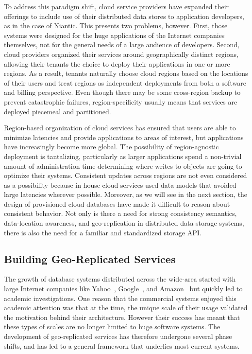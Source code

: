 To address this paradigm shift, cloud service providers have expanded their offerings to include use of their distributed data stores to application developers, as in the case of Niantic.
This presents two problems, however.
First, those systems were designed for the huge applications of the Internet companies themselves, not for the general needs of a large audience of developers.
Second, cloud providers organized their services around geographically distinct regions, allowing their tenants the choice to deploy their applications in one or more regions.
As a result, tenants naturally choose cloud regions based on the locations of their users and treat regions as independent deployments from both a software and billing perspective.
Even though there may be some cross-region backup to prevent catastrophic failures, region-specificity usually means that services are deployed piecemeal and partitioned.

Region-based organization of cloud services has ensured that users are able to minimize latencies and provide applications to areas of interest, but applications have increasingly become more global.
The possibility of region-agnostic deployment is tantalizing, particularly as larger applications spend a non-trivial amount of administration time determining where writes to objects are going to optimize their systems.
Consistent updates across regions are not even considered as a possibility because in-house cloud services used data models that avoided large latencies wherever possible.
Moreover, as we will see in the next section, the design of provisioned cloud databases have made it difficult to reason about consistent behavior.
Not only is there a need for strong consistency semantics, data-location awareness, and geo-replication in distributed data storage systems, there is also the need for a familiar and standardized storage API.

\subsection{Building Geo-Replicated Services}
\label{ch02_systems_background}

The growth of database systems distributed across the wide-area started with large Internet companies like Yahoo~\cite{pnuts}, Google~\cite{bigtable}, and Amazon~\cite{dynamo} but quickly led to academic investigations.
One reason that the commercial systems enjoyed this academic attention was that at the time, the unique scale of their usage validated the motivation behind their architecture.
However their success has meant that these types of scales are no longer limited to huge software systems.
The development of geo-replicated services has therefore undergone several phase shifts, and has led to a general framework that underlies most current systems.

